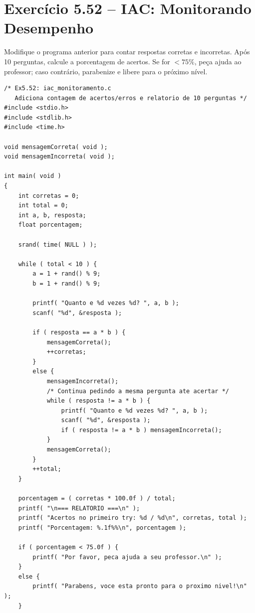 \documentclass[12pt,a4paper]{article}
\begin{document}
\newpage

\section{Exercício 5.52 -- IAC: Monitorando Desempenho}

\begin{enunciadoBox}[Enunciado 5.52]
Modifique o programa anterior para contar respostas corretas e incorretas. Após 10
perguntas, calcule a porcentagem de acertos. Se for $< 75\%$, peça ajuda ao professor;
caso contrário, parabenize e libere para o próximo nível.
\end{enunciadoBox}

\begin{respostabox}
\begin{lstlisting}
/* Ex5.52: iac_monitoramento.c
   Adiciona contagem de acertos/erros e relatorio de 10 perguntas */
#include <stdio.h>
#include <stdlib.h>
#include <time.h>

void mensagemCorreta( void );
void mensagemIncorreta( void );

int main( void )
{
    int corretas = 0;
    int total = 0;
    int a, b, resposta;
    float porcentagem;

    srand( time( NULL ) );

    while ( total < 10 ) {
        a = 1 + rand() % 9;
        b = 1 + rand() % 9;

        printf( "Quanto e %d vezes %d? ", a, b );
        scanf( "%d", &resposta );

        if ( resposta == a * b ) {
            mensagemCorreta();
            ++corretas;
        }
        else {
            mensagemIncorreta();
            /* Continua pedindo a mesma pergunta ate acertar */
            while ( resposta != a * b ) {
                printf( "Quanto e %d vezes %d? ", a, b );
                scanf( "%d", &resposta );
                if ( resposta != a * b ) mensagemIncorreta();
            }
            mensagemCorreta();
        }
        ++total;
    }

    porcentagem = ( corretas * 100.0f ) / total;
    printf( "\n=== RELATORIO ===\n" );
    printf( "Acertos no primeiro try: %d / %d\n", corretas, total );
    printf( "Porcentagem: %.1f%%\n", porcentagem );

    if ( porcentagem < 75.0f ) {
        printf( "Por favor, peca ajuda a seu professor.\n" );
    }
    else {
        printf( "Parabens, voce esta pronto para o proximo nivel!\n" );
    }


\end{lstlisting}
\end{respostabox}
\end{document}
